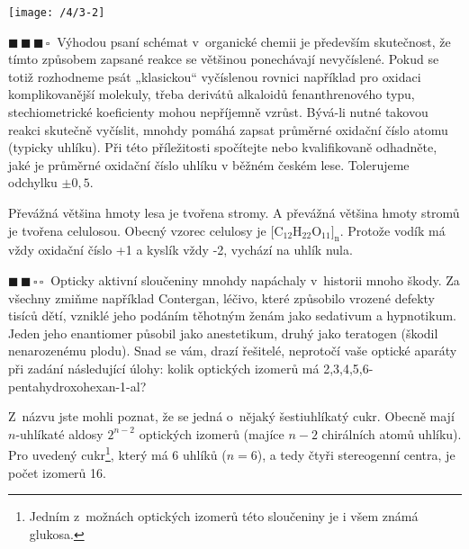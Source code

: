 \documentclass{book}
\newcommand{\dva}{$\blacksquare \, \blacksquare \, \square \, \square \; \; $}
\newcommand{\tri}{$\blacksquare \, \blacksquare \, \blacksquare \, \square \; \; $}
\renewenvironment{quotation}{\par}{\par} %
\begin{document}
\noindent \begin{center}

\texttt{[image: /4/3-2]}

\par\end{center}

\hrulefill %
\begin{quotation}
\tri Výhodou psaní schémat v~organické chemii je především skutečnost,
že tímto způsobem zapsané reakce se většinou ponechávají nevyčíslené.
Pokud se totiž rozhodneme psát „klasickou“ vyčíslenou rovnici například
pro oxidaci komplikovanější molekuly, třeba derivátů alkaloidů fenanthrenového
typu, stechiometrické koeficienty mohou nepříjemně vzrůst. Bývá-li
nutné takovou reakci skutečně vyčíslit, mnohdy pomáhá zapsat průměrné
oxidační číslo atomu (typicky uhlíku). Při této příležitosti spočítejte
nebo kvalifikovaně odhadněte, jaké je průměrné oxidační číslo uhlíku
v běžném českém lese. Tolerujeme odchylku $\pm 0,5$. 
\end{quotation} \dotfill \par 
Převážná většina hmoty lesa je tvořena stromy. A převážná většina
hmoty stromů je tvořena celulosou. Obecný vzorec celulosy je $[\mathrm{C_{12}H_{22}O_{11}]_{n}}$.
Protože vodík má vždy oxidační číslo +1 a kyslík vždy -2, vychází
na uhlík nula.

\newpage %
\begin{quotation}
\dva Opticky aktivní sloučeniny mnohdy napáchaly v~historii mnoho škody.
Za všechny zmiňme například Contergan, léčivo, které způsobilo vrozené
defekty tisíců dětí, vzniklé jeho podáním těhotným ženám jako
sedativum a hypnotikum. Jeden jeho enantiomer působil jako anestetikum,
druhý jako teratogen (škodil nenarozenému plodu). Snad se vám, drazí
řešitelé, neprotočí vaše optické aparáty při zadání následující úlohy:
kolik optických izomerů má 2,3,4,5,6-pentahydroxohexan-1-al?
\end{quotation} \dotfill \par 
Z~názvu jste mohli poznat, že se jedná o~nějaký šestiuhlíkatý cukr. Obecně mají $n$-uhlíkaté aldosy $2^{n-2}$ optických izomerů (majíce $n-2$ chirálních atomů
uhlíku). Pro uvedený cukr\footnote{Jedním z~možnách optických izomerů této sloučeniny je i všem známá glukosa.}, který má 6 uhlíků ($n=6$), a tedy čtyři stereogenní centra, je počet izomerů 16.
\end{document}
